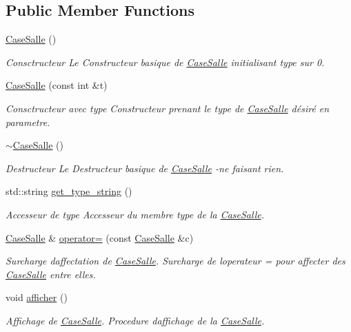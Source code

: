 \subsection*{Public Member Functions}
\begin{DoxyCompactItemize}
\item 
\hyperlink{classCaseSalle_a4252822534722fccb7d8355f79d7f244}{Case\+Salle} ()
\begin{DoxyCompactList}\small\item\em Consctructeur Le Constructeur basique de \hyperlink{classCaseSalle}{Case\+Salle} initialisant type sur 0. \end{DoxyCompactList}\item 
\hyperlink{classCaseSalle_a470fc8fdb01879fd5405392909775fe6}{Case\+Salle} (const int \&t)
\begin{DoxyCompactList}\small\item\em Consctructeur avec type Constructeur prenant le type de \hyperlink{classCaseSalle}{Case\+Salle} désiré en parametre. \end{DoxyCompactList}\item 
\hyperlink{classCaseSalle_aca43a910dbbb59bdac7af10faa5b3f39}{$\sim$\+Case\+Salle} ()
\begin{DoxyCompactList}\small\item\em Destructeur Le Destructeur basique de \hyperlink{classCaseSalle}{Case\+Salle} -\/ne faisant rien. \end{DoxyCompactList}\item 
std\+::string \hyperlink{classCaseSalle_a13007bde12e9dcf3e1985473700c8fae}{get\+\_\+type\+\_\+string} ()
\begin{DoxyCompactList}\small\item\em Accesseur de {\itshape type} Accesseur du membre {\itshape type} de la \hyperlink{classCaseSalle}{Case\+Salle}. \end{DoxyCompactList}\item 
\hyperlink{classCaseSalle}{Case\+Salle} \& \hyperlink{classCaseSalle_a8494bda87f21c608d7da7bb510c0e525}{operator=} (const \hyperlink{classCaseSalle}{Case\+Salle} \&c)
\begin{DoxyCompactList}\small\item\em Surcharge d\textquotesingle{}affectation de \hyperlink{classCaseSalle}{Case\+Salle}. Surcharge de l\textquotesingle{}operateur = pour affecter des \hyperlink{classCaseSalle}{Case\+Salle} entre elles. \end{DoxyCompactList}\item 
void \hyperlink{classCaseSalle_aa892c144815ba118fa911e91b1658ba3}{afficher} ()
\begin{DoxyCompactList}\small\item\em Affichage de \hyperlink{classCaseSalle}{Case\+Salle}. Procedure d\textquotesingle{}affichage de la \hyperlink{classCaseSalle}{Case\+Salle}. \end{DoxyCompactList}\end{DoxyCompactItemize}


